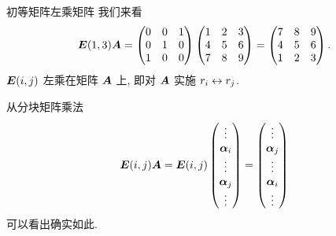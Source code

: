 \begin{frame}{初等矩阵左乘矩阵}
	\onslide<+->
	我们来看
	\[{\boldsymbol{E}}(1,3){\boldsymbol{A}}=\begin{pmatrix}
		0&0&1\\
		0&1&0\\
		1&0&0
	\end{pmatrix}\begin{pmatrix}
		1&2&3\\
		4&5&6\\
		7&8&9
	\end{pmatrix}=\begin{pmatrix}
		7&8&9\\
		4&5&6\\
		1&2&3
	\end{pmatrix}.\]
	\onslide<+->
	${\boldsymbol{E}}(i,j)$ 左乘在矩阵 ${\boldsymbol{A}}$ 上, 即对 ${\boldsymbol{A}}$ 实施 $r_i\leftrightarrow r_j$.

	\onslide<+->
	从分块矩阵乘法
	\[{\boldsymbol{E}}(i,j){\boldsymbol{A}}={\boldsymbol{E}}(i,j)\begin{pmatrix}
		\vdots\\
		{\boldsymbol{\alpha}}_i\\
		\vdots\\
		{\boldsymbol{\alpha}}_j\\
		\vdots
	\end{pmatrix}=\begin{pmatrix}
		\vdots\\
		{\boldsymbol{\alpha}}_j\\
		\vdots\\
		{\boldsymbol{\alpha}}_i\\
		\vdots
	\end{pmatrix}\]
	可以看出确实如此.
\end{frame}


